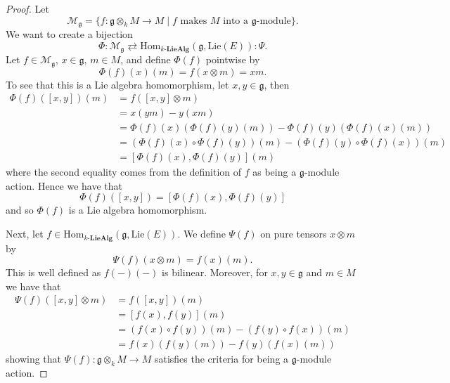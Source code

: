 \begin{proof}
  Let
  \begin{equation}
    \mathcal{M}_\mathfrak{g} = \{f: \mathfrak{g} \otimes_k M \to M \mid f \text{ makes } M \text{ into a } \mathfrak{g}\text{-module}\}
  .\end{equation}
  We want to create a bijection
  \begin{equation*}
    \Phi: \mathcal{M}_{\mathfrak{g}} \rightleftarrows \text{Hom}_{k\text{-}\mathbf{LieAlg}}(\mathfrak{g}, \text{Lie}(E)): \Psi
  .\end{equation*}
  Let $ f \in \mathcal{M}_{\mathfrak{g}} $, $ x \in \mathfrak{g} $, $ m \in M $, and define $ \Phi(f) $ pointwise by
  \begin{equation}
    \Phi(f)(x)(m) = f(x \otimes m) = xm.
  \end{equation}
  To see that this is a Lie algebra homomorphism, let $ x, y \in \mathfrak{g} $, then
  \begin{align*}
    \Phi(f)([x,y])(m) &= f([x,y] \otimes m) \\
                      &= x(ym) - y(xm) \\
                      &= \Phi(f)(x)(\Phi(f)(y)(m)) - \Phi(f)(y)(\Phi(f)(x)(m)) \\
                      &= (\Phi(f)(x) \circ \Phi(f)(y))(m) - (\Phi(f)(y)\circ \Phi(f)(x))(m) \\
                      &= [\Phi(f)(x), \Phi(f)(y)](m)
  \end{align*}
  where the second equality comes from the definition of $ f $ as being a $ \mathfrak{g} $-module action. Hence we have that
  \begin{equation*}
    \Phi(f)([x,y]) = [\Phi(f)(x), \Phi(f)(y)]
  \end{equation*}
  and so $ \Phi(f) $ is a Lie algebra homomorphism.

  Next, let $ f \in \text{Hom}_{k\text{-}\mathbf{LieAlg}}(\mathfrak{g}, \text{Lie}(E)) $. We define $ \Psi(f) $ on pure tensors $ x \otimes m $ by
  \begin{equation}
    \Psi(f)(x \otimes m) = f(x)(m).
  \end{equation}
  This is well defined as $ f(-)(-) $ is bilinear. Moreover, for $ x,y \in \mathfrak{g} $ and $ m \in M $ we have that
  \begin{align*}
    \Psi(f)([x,y] \otimes m) &= f([x,y])(m) \\
                             &= [f(x), f(y)](m) \\
                             &= (f(x)\circ f(y))(m) - (f(y)\circ f(x))(m) \\
                             &= f(x)(f(y)(m)) - f(y)(f(x)(m))
  \end{align*}
  showing that $ \Psi(f): \mathfrak{g} \otimes_k M \to M $ satisfies the criteria for being a $ \mathfrak{g} $-module action.


\end{proof}
